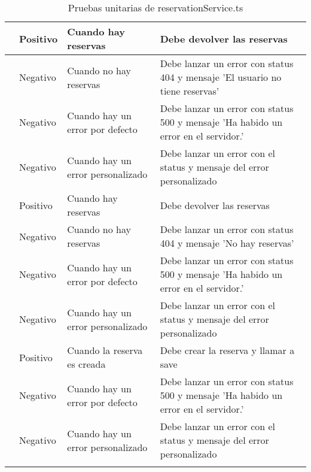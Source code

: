 \begin{small}
\begin{longtable}[H]{|>{\centering\arraybackslash}m{3cm}|>{\centering\arraybackslash}m{2cm}|>{\centering\arraybackslash}m{3cm}|>{\centering\arraybackslash}m{4cm}|}
		\multirow{4}{4cm}{Get all reservations}       & Positivo              & Cuando hay reservas                      & Debe devolver las reservas                                                         \\
		\cline{2-4}
		                                              & Negativo              & Cuando no hay reservas                   & Debe lanzar un error con status 404 y mensaje 'El usuario no tiene reservas'       \\
		\cline{2-4}
		                                              & Negativo              & Cuando hay un error por defecto          & Debe lanzar un error con status 500 y mensaje 'Ha habido un error en el servidor.' \\
		\cline{2-4}
		                                              & Negativo              & Cuando hay un error personalizado        & Debe lanzar un error con el status y mensaje del error personalizado               \\
		\hline

		\multirow{4}{4cm}{Get all admin reservations} & Positivo              & Cuando hay reservas                      & Debe devolver las reservas                                                         \\
		\cline{2-4}
		                                              & Negativo              & Cuando no hay reservas                   & Debe lanzar un error con status 404 y mensaje 'No hay reservas'                    \\
		\cline{2-4}
		                                              & Negativo              & Cuando hay un error por defecto          & Debe lanzar un error con status 500 y mensaje 'Ha habido un error en el servidor.' \\
		\cline{2-4}
		                                              & Negativo              & Cuando hay un error personalizado        & Debe lanzar un error con el status y mensaje del error personalizado               \\
		\hline

		\multirow{3}{4cm}{Create reservation}         & Positivo              & Cuando la reserva es creada              & Debe crear la reserva y llamar a save                                              \\
		\cline{2-4}
		                                              & Negativo              & Cuando hay un error por defecto          & Debe lanzar un error con status 500 y mensaje 'Ha habido un error en el servidor.' \\
		\cline{2-4}
		                                              & Negativo              & Cuando hay un error personalizado        & Debe lanzar un error con el status y mensaje del error personalizado               \\
		\hline
		\caption{Pruebas unitarias de reservationService.ts}
	\end{longtable}
\end{small}

